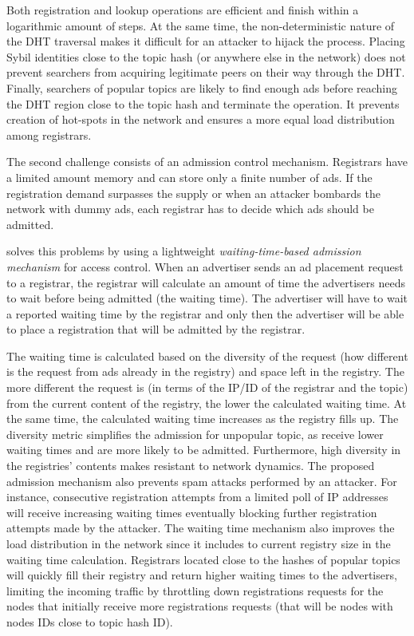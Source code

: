 Both registration and lookup operations are efficient and finish within a logarithmic amount of steps. At the same time, the non-deterministic nature of the DHT traversal makes it difficult for an attacker to hijack the process. Placing Sybil identities close to the topic hash (or anywhere else in the network) does not prevent searchers from acquiring legitimate peers on their way through the DHT. Finally, searchers of popular topics are likely to find enough ads before reaching the DHT region close to the topic hash and terminate the operation. It prevents creation of hot-spots in the network and ensures a more equal load distribution among registrars. 

 The second challenge consists of an admission control mechanism. Registrars have a limited amount memory and can store only a finite number of ads. If the registration demand surpasses the supply or when an attacker bombards the network with dummy ads, each registrar has to decide which ads should be admitted. 

\sysname solves this problems by using a lightweight \textit{waiting-time-based admission mechanism} for access control. When an advertiser sends an ad placement request to a registrar, the registrar will calculate an amount of time the advertisers needs to wait before being admitted (\ie the waiting time). 
The advertiser will have to wait a reported waiting time by the registrar and only then the advertiser will be able to place a registration that will be admitted by the registrar.

The waiting time is calculated based on the diversity of the request (\ie how different is the request from ads already in the registry) and space left in the registry. 
The more different the request is (in terms of the IP/ID of the registrar and the topic) from the current content of the registry, the lower the calculated waiting time. 
At the same time, the calculated waiting time increases as the registry fills up. 
The diversity metric  simplifies the admission for unpopular topic, as receive lower waiting times and are more likely to be admitted.
Furthermore,  high diversity in the registries' contents makes \sysname resistant to network dynamics. The proposed admission mechanism also prevents spam attacks performed by an attacker. 
For instance, consecutive registration attempts from a limited poll of IP addresses will receive increasing waiting times eventually blocking further registration attempts made by the attacker. 
The waiting time mechanism also improves the load distribution in the network since it includes to current registry size in the waiting time calculation.
Registrars located close to the hashes of popular topics will quickly fill their registry and return higher waiting times to the advertisers, limiting the incoming traffic by throttling down registrations requests for the nodes that initially receive more registrations requests (that will be nodes with nodes IDs close to topic hash ID).



